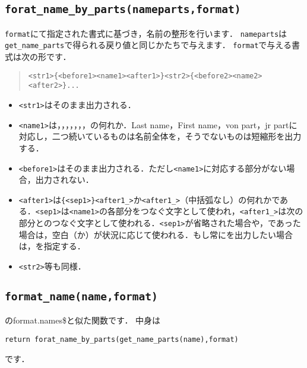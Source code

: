 \documentclass[a4paper,lualatex]{jlreq}
\makeatletter
\newcommand{\luafunc}[1]{\texttt{#1}}
\def\luastring{\@ifstar{\luastring@s}{\luastring@}}
\newcommand*{\luastring@s}[1]{``\texttt{#1}''}
\newcommand*{\luavar}[1]{\texttt{#1}}
\makeatother
\begin{document}
\subsection{\luafunc{forat\_name\_by\_parts(nameparts,format)}}
\luavar{format}にて指定された書式に基づき，名前の整形を行います．
\luavar{nameparts}は\luafunc{get\_name\_parts}で得られる戻り値と同じかたちで与えます．
\luavar{format}で与える書式は次の形です．
\begin{quote}
\begin{verbatim}
<str1>{<before1><name1><after1>}<str2>{<before2><name2><after2>}...
\end{verbatim}
\end{quote}
\begin{itemize}
\item \verb|<str1>|はそのまま出力される．
\item \verb|<name1>|は\luastring{l}，\luastring{ll}，\luastring{f}，\luastring{ff}，\luastring{v}，\luastring{vv}，\luastring{j}，\luastring{jj}の何れか．Last name，First name，von part，jr partに対応し，二つ続いているものは名前全体を，そうでないものは短縮形を出力する．
\item \verb|<before1>|はそのまま出力される．ただし\verb|<name1>|に対応する部分がない場合，出力されない．
\item \verb|<after1>|は\verb|{<sep1>}<after1_>|か\verb|<after1_>|（中括弧なし）の何れかである．\verb|<sep1>|は\verb|<name1>|の各部分をつなぐ文字として使われ，\verb|<after1_>|は次の部分とのつなぐ文字として使われる．\verb|<sep1>|が省略された場合や，\luastring{~}であった場合は，空白（\luastring{ }か\luastring{~}）が状況に応じて使われる．もし常に\luastring{~}を出力したい場合は，\luastring{~~}を指定する．
\item \verb|<str2>|等も同様．
\end{itemize}

\subsection{\luafunc{format\_name(name,format)}}
\BibTeX のformat.names\$と似た関数です．
中身は
\begin{lstlisting}
return forat_name_by_parts(get_name_parts(name),format)
\end{lstlisting}
です．
\end{document}
